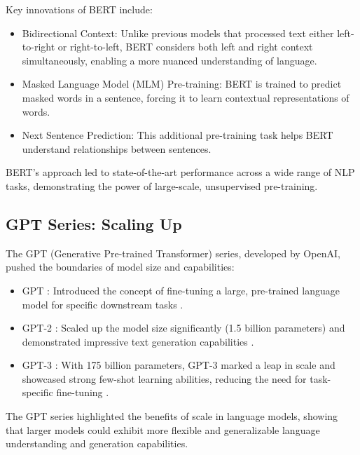\documentclass[logo,msc]{infthesis}           %
\begin{document}
Key innovations of BERT include:

\begin{itemize}
 
   \item Bidirectional Context: Unlike previous models that processed text either left-to-right or right-to-left, BERT considers both left and right context simultaneously, enabling a more nuanced understanding of language.
   \item Masked Language Model (MLM) Pre-training: BERT is trained to predict masked words in a sentence, forcing it to learn contextual representations of words.
   \item Next Sentence Prediction: This additional pre-training task helps BERT understand relationships between sentences.
\end{itemize}

BERT's approach led to state-of-the-art performance across a wide range of NLP tasks, demonstrating the power of large-scale, unsupervised pre-training.

\subsection*{GPT Series: Scaling Up}

The GPT (Generative Pre-trained Transformer) series, developed by OpenAI, pushed the boundaries of model size and capabilities:
\begin{itemize}
 
   \item GPT : Introduced the concept of fine-tuning a large, pre-trained language model for specific downstream tasks \cite{radford2018improving}.
   \item GPT-2 : Scaled up the model size significantly (1.5 billion parameters) and demonstrated impressive text generation capabilities \cite{radford2019language}.
   \item GPT-3 : With 175 billion parameters, GPT-3 marked a leap in scale and showcased strong few-shot learning abilities, reducing the need for task-specific fine-tuning \cite{brown2020language}.
\end{itemize}
The GPT series highlighted the benefits of scale in language models, showing that larger models could exhibit more flexible and generalizable language understanding and generation capabilities.
\end{document}

